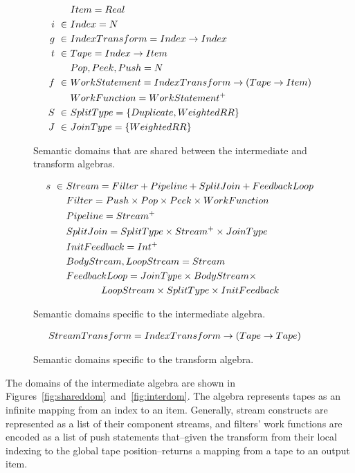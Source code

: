 \begin{figure}[t]
\scriptsize
\begin{align*}
&Item = Real \\
i~\in~&Index = N \\
g~\in~&IndexTransform = Index \rightarrow Index \\
t~\in~&Tape = Index \rightarrow Item \\
&Pop, Peek, Push = N \\ 
f~\in~&WorkStatement = IndexTransform \rightarrow (Tape \rightarrow Item) \\ 
&WorkFunction = WorkStatement^{+} \\
S~\in~&SplitType = \{Duplicate, WeightedRR\} \\ 
J~\in~&JoinType = \{WeightedRR\}
\end{align*}
\vspace{-18pt}
\caption{Semantic domains that are shared between the intermediate and
  transform algebras.
\protect\label{fig:shareddom}}
\vspace{-6pt}
\begin{align*}
s~\in~&Stream = Filter + Pipeline + SplitJoin + FeedbackLoop \\
&Filter = Push \times Pop \times Peek \times WorkFunction \\
&Pipeline = Stream^{+} \\
&SplitJoin = SplitType \times Stream^{+} \times JoinType \\
&InitFeedback = Int^{+} \\
&BodyStream, LoopStream = Stream \\
&FeedbackLoop = JoinType \times BodyStream \times \\
& \hspace{0.5in} LoopStream \times SplitType \times InitFeedback
\end{align*}
\vspace{-18pt}
\caption{Semantic domains specific to the intermediate algebra.
\protect\label{fig:interdom}}
\vspace{-6pt}
\begin{align*}
&StreamTransform =  IndexTransform \rightarrow (Tape \rightarrow Tape)
\end{align*}
\vspace{-12pt}
\caption{Semantic domains specific to the transform algebra.
\protect\label{fig:transformdom}}
\vspace{-12pt}
\end{figure}

The domains of the intermediate algebra are shown in
Figures~\ref{fig:shareddom}~and~\ref{fig:interdom}.  The algebra
represents tapes as an infinite mapping from an index to an item.
Generally, stream constructs are represented as a list of their
component streams, and filters' work functions are encoded as a list of
push statements that--given the transform from their local indexing to
the global tape position--returns a mapping from a tape to an output
item.

